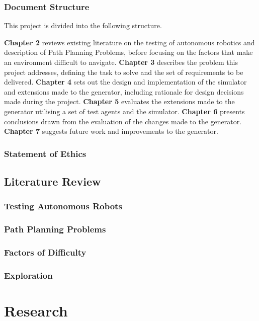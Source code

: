 \documentclass[authoryearcitations]{UoYCSproject}
\begin{document}
\section{Document Structure}
\label{sec:DocStruct}
This project is divided into the following structure.

\textbf{Chapter 2} reviews existing literature on the testing of autonomous robotics and description of Path Planning Problems, before focusing on the factors that make an environment difficult to navigate.
\textbf{Chapter 3} describes the problem this project addresses, defining the task to solve and the set of requirements to be delivered.
\textbf{Chapter 4} sets out the design and implementation of the simulator and extensions made to the generator, including rationale for design decisions made during the project.
\textbf{Chapter 5} evaluates the extensions made to the generator utilising a set of test agents and the simulator.
\textbf{Chapter 6} presents conclusions drawn from the evaluation of the changes made to the generator.
\textbf{Chapter 7} suggests future work and improvements to the generator.

\section{Statement of Ethics}
\label{sec:Ethics}

\chapter{Literature Review}
\label{cha:LitReview}
\section{Testing Autonomous Robots}
\label{sec:lit1}
\section{Path Planning Problems}
\label{sec:lit2}
\section{Factors of Difficulty}
\label{sec:lit3}
\section{Exploration}
\label{sec:lit4}


\part{Research}
\label{sec:research}
\end{document}
